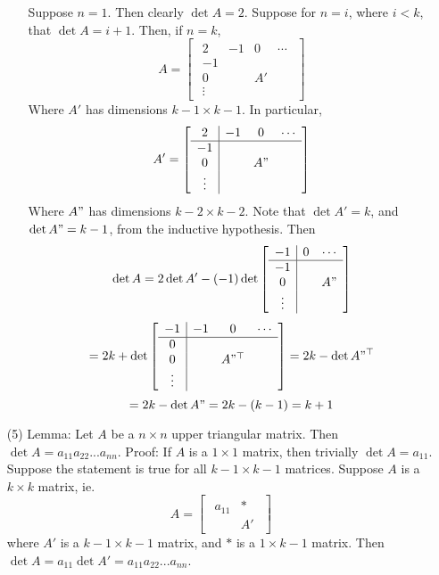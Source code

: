 \begin{itemize}
\begin{itemize}
Suppose $n = 1$. Then clearly $\det A = 2$. Suppose for $n = i$, where $i < k$, that $\det A = i + 1$. Then, if $n = k$,
$$A = \begin{bmatrix}
\begin{array}{c|ccc}
2 & -1 & 0 & \cdots \\
\hline
-1 & \\
0 & & A' \\
\vdots &
\end{array}
\end{bmatrix}$$
Where $A'$ has dimensions $k - 1 \times k - 1$. In particular,
$$A' = \begin{bmatrix}
\begin{array}{c|ccc}
2 & -1 & 0 & \cdots \\
\hline
-1 & \\
0 & & A" \\
\vdots &
\end{array}
\end{bmatrix}$$
Where $A"$ has dimensions $k - 2 \times k - 2$. 
Note that $\det A' = k$, and $\det A" = k - 1$, from the inductive hypothesis. Then
$$\det A = 2\det A' - (-1)\det\begin{bmatrix}
\begin{array}{c|cc}
-1 & 0 & \cdots\\
\hline
-1 & \\
0 & & A" \\
\vdots &
\end{array}
\end{bmatrix}$$
$$= 2k + \det\begin{bmatrix}
\begin{array}{c|ccc}
-1 & -1 & 0 & \cdots \\
\hline
0 & \\
0 & & A"^\top \\
\vdots &
\end{array}
\end{bmatrix} = 2k - \det A"^\top$$
$$= 2k - \det A" = 2k - (k - 1) = k + 1$$
\end{itemize}
\item[(5)]
Lemma: Let $A$ be a $n \times n$ upper triangular matrix. Then $\det A = a_{11}a_{22}...a_{nn}$. Proof: If $A$ is a $1 \times 1$ matrix, then trivially $\det A = a_{11}$. Suppose the statement is true for all $k - 1 \times k - 1$ matrices. Suppose $A$ is a $k \times k$ matrix, ie.
$$A = \begin{bmatrix}
\begin{array}{c|c}
a_{11} & * \\
& A'
\end{array}
\end{bmatrix}$$
where $A'$ is a $k - 1 \times k - 1$ matrix, and $*$ is a $1 \times k - 1$ matrix. Then $\det A = a_{11}\det A' = a_{11}a_{22}...a_{nn}$.


\end{itemize}
